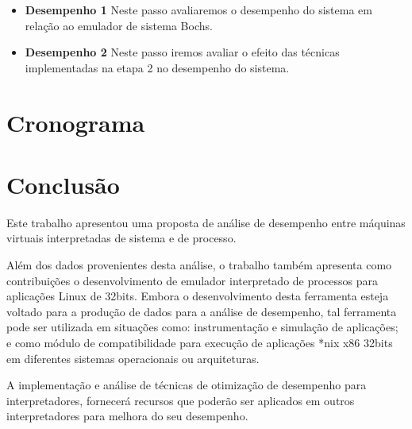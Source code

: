 \documentclass[11pt,twoside]{article}
\begin{document}
\begin{itemize}
 \item \textbf{Desempenho 1} Neste passo avaliaremos o desempenho do sistema em relação ao emulador de sistema Bochs.
 \item \textbf{Desempenho 2} Neste passo iremos avaliar o efeito das técnicas implementadas na etapa 2 no desempenho do sistema.
\end{itemize}

\section{Cronograma}

\section{Conclusão}

Este trabalho apresentou uma proposta de análise de desempenho entre máquinas virtuais interpretadas de sistema e de processo.

Além dos dados provenientes desta análise, o trabalho também apresenta como contribuições o desenvolvimento de emulador interpretado de processos para aplicações Linux de 32bits.
Embora o desenvolvimento desta ferramenta esteja voltado para a produção de dados para a análise de desempenho, tal ferramenta pode ser utilizada em situações como: instrumentação e simulação de aplicações; e como 
módulo de compatibilidade para execução de aplicações *nix x86 32bits em diferentes sistemas operacionais ou arquiteturas.

A implementação e análise de técnicas de otimização de desempenho para interpretadores, fornecerá recursos que poderão ser aplicados em outros interpretadores para melhora do seu desempenho. 


\end{document}
